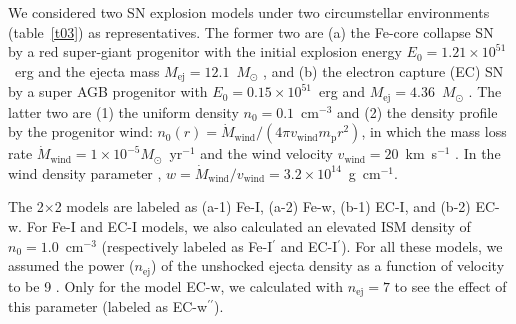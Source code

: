 \documentclass[]{pasj01}
\begin{document}
We considered two SN explosion models under two circumstellar environments
(table~\ref{t03}) as representatives. The former two are (a) the Fe-core collapse SN by
a red super-giant progenitor with the initial explosion energy $E_0=1.21 \times
10^{51}$~erg and the ejecta mass $M_{\mathrm{ej}}=12.1$~$M_{\odot}$ \citep{patnaude15},
and (b) the electron capture (EC) SN by a super AGB progenitor with $E_0=0.15 \times
10^{51}$~erg and $M_{\mathrm{ej}}=4.36$~$M_{\odot}$ \citep{moriya14}. The latter two are
(1) the uniform density $n_0=0.1$~cm$^{-3}$ and (2) the density profile by the
progenitor wind: $n_{0}(r) = \dot{M}_{\mathrm{wind}} / (4 \pi v_{\mathrm{wind}}
m_{\mathrm{p}}r^{2})$, in which the mass loss rate $\dot{M}_{\mathrm{wind}} = 1 \times
10^{-5} M_{\odot}$~yr$^{-1}$ and the wind velocity $v_{\mathrm{wind}} = 20$~km~s$^{-1}$
\citep{moriya14}. In the wind density parameter \citep{chugai94}, $w =
\dot{M}_{\mathrm{wind}}/v_{\mathrm{wind}} = 3.2 \times 10 ^{14}$~g~cm$^{-1}$.

The 2$\times$2 models are labeled as (a-1) Fe-I, (a-2) Fe-w, (b-1)
EC-I, and (b-2) EC-w. For Fe-I and EC-I models, we also calculated an elevated ISM
density of $n_0=1.0$~cm$^{-3}$ (respectively labeled as Fe-I$^{\prime}$ and
EC-I$^{\prime}$). For all these models, we assumed the power ($n_{\mathrm{ej}}$) of the
unshocked ejecta density as a function of velocity to be 9 \citep{fransson96}. Only for
the model EC-w, we calculated with $n_{\mathrm{ej}}=7$ to see the effect of this
parameter (labeled as EC-w$^{\prime\prime}$).
\end{document}
